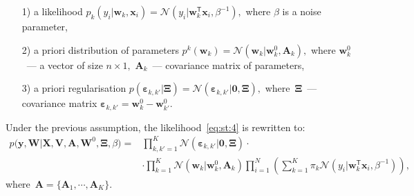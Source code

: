 \documentclass[12pt, twoside]{article}
\begin{document}
\begin{enumerate}
	\item[1)] a likelihood $p_{k}\left(y_{i}|\mathbf{w}_{k}, \mathbf{x}_{i}\right) = \mathcal{N}\left(y_{i}|\mathbf{w}_{k}^{\mathsf{T}}\mathbf{x}_{i}, \beta^{-1}\right),$ where $\beta$ is a noise parameter,
	\item[2)] a priori distribution of parameters $p^{k}\left(\mathbf{w}_{k}\right) = \mathcal{N}\left(\mathbf{w}_{k}|\mathbf{w}^{0}_{k}, \mathbf{A}_{k}\right),$ where $\mathbf{w}^{0}_{k}$~--- a vector of size $n\times1,$ $\mathbf{A}_{k}$~--- covariance matrix of parameters,
	\item[3)] a priori regularisation $p\left(\bm{\varepsilon}_{k,k'}|\bm{\Xi}\right) = \mathcal{N}\left(\bm{\varepsilon}_{k,k'}|\mathbf{0},  \bm{\Xi}\right),$ where~$\bm{\Xi}$~--- covariance matrix $\bm{\varepsilon}_{k,k'} = \mathbf{w}_{k}^{0}-\mathbf{w}_{k'}^{0}.$
\end{enumerate}
Under the previous assumption, the likelihood~\eqref{eq:st:4} is rewritten to:
\[
\label{eq:em:1}
\begin{aligned}
p\bigr(\mathbf{y}, \mathbf{W}|\mathbf{X}, \mathbf{V}, \textbf{A}, \textbf{W}^{0}, \bm{\Xi}, \beta\bigr) = &\prod_{k,k'=1}^{K}\mathcal{N}\left(\bm{\varepsilon}_{k,k'}|\mathbf{0},  \bm{\Xi}\right)\cdot\\
&\cdot\prod_{k=1}^{K}\mathcal{N}\left(\mathbf{w}_{k}|\mathbf{w}^{0}_{k}, \mathbf{A}_{k}\right)\prod_{i=1}^{N}\left(\sum_{k=1}^{K}\pi_{k}\mathcal{N}\left(y_{i}|\mathbf{w}_{k}^{\mathsf{T}}\mathbf{x}_{i}, \beta^{-1}\right)\right),
\end{aligned}
\]
 where~$\mathbf{A} = \bigr\{\mathbf{A}_1, \cdots, \mathbf{A}_K\bigr\}.$
 
\end{document}
